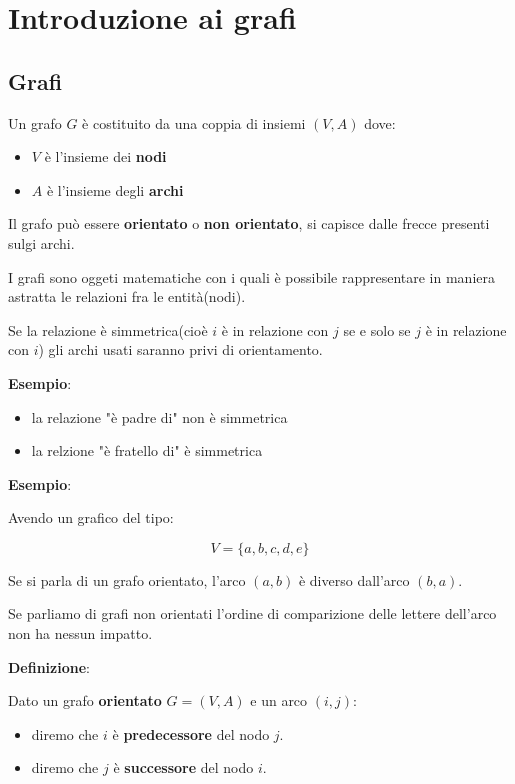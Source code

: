 \section{Introduzione ai grafi}

\subsection{Grafi}

Un grafo $G$ è costituito da una coppia di insiemi $(V, A)$ dove:
\begin{itemize}
    \item $V$ è l'insieme dei \textbf{nodi}
    \item $A$ è l'insieme degli \textbf{archi}
\end{itemize}

Il grafo può essere \textbf{orientato} o \textbf{non orientato}, si capisce dalle frecce presenti sulgi archi.

I grafi sono oggeti matematiche con i quali è possibile rappresentare in maniera astratta le relazioni fra le entità(nodi).

Se la relazione è simmetrica(cioè $i$ è in relazione con $j$ se e solo se $j$ è in relazione con $i$) gli archi 
usati saranno privi di orientamento.

\textbf{Esempio}:

\begin{itemize}
    \item la relazione "è padre di" non è simmetrica
    \item la relzione "è fratello di" è simmetrica
\end{itemize}

\textbf{Esempio}:

Avendo un grafico del tipo:

\begin{equation*}
    V = \{a, b, c, d, e\}
\end{equation*}

Se si parla di un grafo orientato, l'arco $(a, b)$ è diverso dall'arco $(b, a)$.

Se parliamo di grafi non orientati l'ordine di comparizione delle lettere dell'arco non ha nessun impatto.

\textbf{Definizione}:

Dato un grafo \textbf{orientato} $G = (V, A)$ e un arco $(i, j)$:
\begin{itemize}
    \item diremo che $i$ è \textbf{predecessore} del nodo $j$.
    \item diremo che $j$ è \textbf{successore} del nodo $i$.
\end{itemize}

